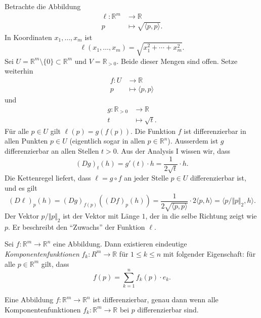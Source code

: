 \documentclass[../main.tex]{subfiles}
\begin{document}
\begin{example}
  Betrachte die Abbildung
  \begin{align*}
    \ell \colon \mathbb{R}^m & \to \mathbb{R} \\
    p & \mapsto \sqrt{\langle p, p \rangle}.
  \end{align*}
  In Koordinaten $x_1, \dots, x_m$ ist
   \[
     \ell(x_1, \dots, x_m) = \sqrt{x_1^2 + \cdots + x_m^2}.
  \]
  Sei $U = \mathbb{R}^m \setminus \{0\} \subset \mathbb{R}^m$ 
  und $V = \mathbb{R}_{>0}$.
  Beide dieser Mengen sind offen. Setze weiterhin
  \begin{align*}
    f \colon U & \to \mathbb{R} \\
    p & \mapsto \langle p, p \rangle
  \end{align*}
  und
  \begin{align*}
    g \colon \mathbb{R}_{>0} & \to \mathbb{R} \\
    t & \mapsto \sqrt t.
  \end{align*}
  Für alle $p \in U$ gilt $\ell(p) = g(f(p))$.
  Die Funktion $f$ ist differenzierbar in allen
  Punkten $p \in U$ 
  (eigentlich sogar in allen $p \in \mathbb{R}^n$).
  Ausserdem ist $g$ differenzierbar an allen Stellen
  $t > 0$.
  Aus der Analysis I wissen wir, dass
  \[
    {(Dg)}_t(h) = g'(t) \cdot h = \frac{1}{2 \sqrt t} \cdot h.
  \]
  Die Kettenregel liefert, dass
  $\ell = g \circ f$ an jeder Stelle $p \in U$ differenzierbar ist,
  und es gilt
  \[
    {(D \ell)}_p(h) = {(Dg)}_{f(p)}({(Df)}_p(h))
    = \frac{1}{2 \sqrt{\langle p, p \rangle}} \cdot 2 \langle p, h \rangle
    = \langle p / \Vert p \Vert_2, h \rangle.
  \]
  Der Vektor $p / \Vert p \Vert_2$ ist der Vektor mit Länge $1$,
  der in die selbe Richtung zeigt wie $p$.
  Er beschreibt den ``Zuwachs'' der Funktion $\ell$.
\end{example}

\begin{definition}
  Sei $f \colon \mathbb{R}^m \to \mathbb{R}^n$ eine Abbildung.
  Dann existieren eindeutige \emph{Komponentenfunktionen}
  $f_k \colon R^m \to \mathbb{R}$ 
  für $1 \leq k \leq n$ mit folgender Eigenschaft:
  für alle $p \in \mathbb{R}^m$ gilt, dass
  \[
    f(p) = \sum_{k=1}^{n} f_k(p) \cdot e_k.
  \]
\end{definition}

\begin{lemma}
  Eine Abbildung $f \colon \mathbb{R}^m \to \mathbb{R}^n$ ist differenzierbar,
  genau dann wenn alle Komponentenfunktionen 
  $f_k \colon \mathbb{R}^m \to \mathbb{R}$ bei $p$ differenzierbar sind.
\end{lemma}
\end{document}
